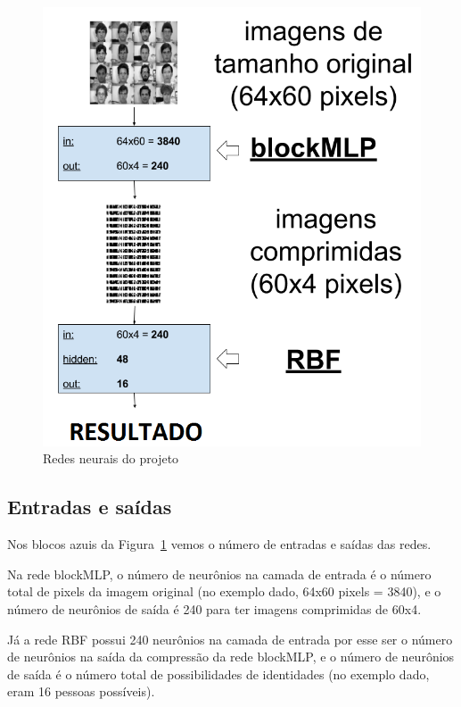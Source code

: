 \documentclass[hidelinks,11pt,twocolumn]{article}
\begin{document}
\begin{figure}[H]
\centering
\graphicspath{{IMAGENS/}}
\includegraphics[width = 1\linewidth]{blockmlprbf.png}
\setlength{\abovecaptionskip}{0pt}
\setlength{\belowcaptionskip}{0pt}
\caption{Redes neurais do projeto}
\label{redesdoprojeto}
\end{figure}


\subsection{Entradas e saídas}

Nos blocos azuis da Figura~\ref{redesdoprojeto} vemos o número de entradas e saídas das redes.

Na rede blockMLP, o número de neurônios na camada de entrada é o número total de pixels da imagem original (no exemplo dado, 64x60 pixels = 3840), e o número de neurônios de saída é 240 para ter imagens comprimidas de 60x4.

Já a rede RBF possui 240 neurônios na camada de entrada por esse ser o número de neurônios na saída da compressão da rede blockMLP, e o número de neurônios de saída é o número total de possibilidades de identidades (no exemplo dado, eram 16 pessoas possíveis).
\end{document}
